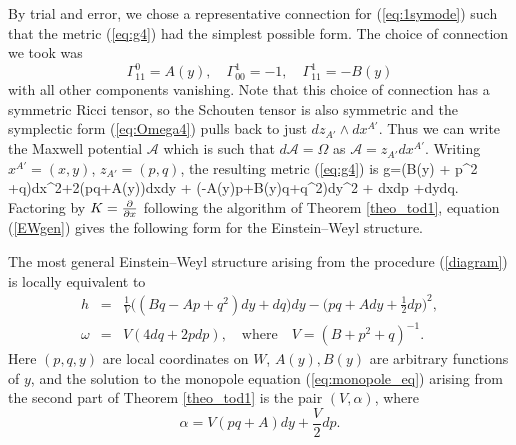 By trial and error, we chose a representative connection for (\ref{eq:1symode}) such that the metric (\ref{eq:g4}) had the simplest possible form. The choice of connection we took was
\[
\Gamma^{0}_{11}=A(y),\quad \Gamma^{1}_{00}=-1, \quad \Gamma^{1}_{11}=-B(y)
\]
with all other components vanishing. Note that this choice of connection has a symmetric Ricci tensor, so the Schouten tensor is also symmetric and the symplectic form (\ref{eq:Omega4}) pulls back to just $dz_{A'}\wedge dx^{A'}$. Thus we can write the Maxwell potential $\mathcal{A}$ which is such that $d\mathcal{A}=\Omega$ as $\mathcal{A}=z_{A'}dx^{A'}$. Writing $x^{A'}=(x,y)$, $z_{A'}=(p,q)$, the resulting metric (\ref{eq:g4}) is
\be
\label{einstein_1}
g=(B(y) + p^2 +q)dx^2+2(pq+A(y))dxdy + (-A(y)p+B(y)q+q^2)dy^2 + dxdp +dydq.
\ee
Factoring by $K=\frac{\partial}{\partial x}$ following the algorithm of Theorem
\ref{theo_tod1}, equation (\ref{EWgen}) gives the following form for the Einstein--Weyl structure.
\begin{prop}
\label{prop1}
The most general  Einstein--Weyl structure arising
from the procedure (\ref{diagram}) is locally equivalent to
\begin{eqnarray}
\label{ew_final}
h&=&\frac{1}{V}\big((Bq -Ap+ q^2)dy+dq\big)dy
-\Big({pq+A}dy+\frac{1}{2}dp\Big)^2, \label{genh} \\
\omega&=&V(4dq+2 pdp), \quad\mbox{where}\quad V=
({B}+ p^2+q)^{-1}.\nonumber
\end{eqnarray}
Here $(p, q, y)$ are local coordinates on $W$, $A(y), B(y)$ are arbitrary functions of $y$, and the solution to the monopole equation (\ref{eq:monopole_eq}) arising from the second part of Theorem \ref{theo_tod1} is the pair $(V,\alpha)$, where
\[
\alpha=V( pq+A)dy+\frac{V}{2}dp.
\]
\end{prop}


